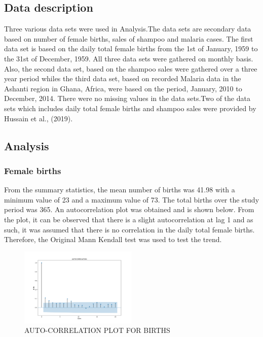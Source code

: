 \documentclass[12pt, letterpaper, twoside]{article}
\begin{document}
\subsection{Data description}
Three various data sets were used in Analysis.The data sets are secondary data based on number of female births, sales of shampoo and malaria cases. The first data set is based on the daily total female births from the 1st of January, 1959 to the 31st of December, 1959. All three data sets were gathered on monthly basis. Also, the second data set, based on the shampoo sales were gathered over a three year period whiles the third data set, based on recorded Malaria data in the Ashanti region in Ghana, Africa, were based on the period, January, 2010 to December, 2014. There were no missing values in the data sets.Two of the data sets which includes daily total female births and shampoo sales were provided by Hussain et al., (2019).
\subsection{Analysis}
\subsubsection{Female births}
From the summary statistics, the mean number of births was 41.98 with a minimum value of 23 and a maximum value of 73. The total births over the study period was 365. An autocorrelation plot was obtained and is shown below. From the plot, it can be observed that there is a slight autocorrelation at lag 1 and as such, it was assumed that there is no correlation in the daily total female births. Therefore, the Original Mann Kendall test was used to test the trend.\\

\begin{figure}
	    \centering
	        \includegraphics[width=0.5\textwidth]{BIRTH_DATA_ACF_PLOT.png}
		    \caption{AUTO-CORRELATION PLOT FOR BIRTHS}
		        \label{fig:1}
\end{figure}
\end{document}
